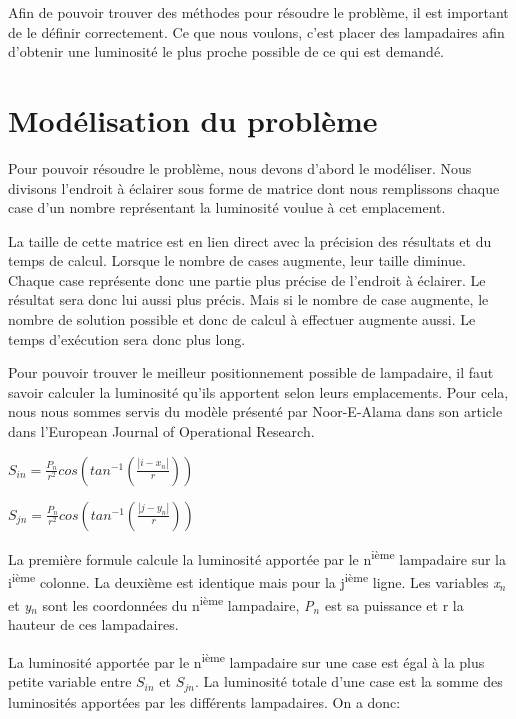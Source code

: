 Afin de pouvoir trouver des m\'{e}thodes pour r\'{e}soudre le probl\`{e}me, il est important de le d\'{e}finir correctement. Ce que nous voulons, c'est placer des lampadaires afin d'obtenir une luminosit\'{e} le plus proche possible de ce qui est demand\'{e}.

\section{Mod\'{e}lisation du probl\`{e}me}
Pour pouvoir r\'{e}soudre le probl\`{e}me, nous devons d'abord le mod\'{e}liser.  Nous divisons l'endroit \`{a} \'{e}clairer sous forme de matrice dont nous remplissons chaque case d'un nombre repr\'{e}sentant la luminosit\'{e} voulue \`{a} cet emplacement.

La taille de cette matrice est en lien direct avec la pr\'{e}cision des r\'{e}sultats et du temps de calcul. Lorsque le nombre de cases augmente, leur taille diminue. Chaque case repr\'{e}sente donc une partie plus pr\'{e}cise de l'endroit \`{a} \'{e}clairer. Le r\'{e}sultat sera donc lui aussi plus pr\'{e}cis. Mais si le nombre de case augmente, le nombre de solution possible et donc de calcul \`{a} effectuer augmente aussi. Le temps d'ex\'{e}cution sera donc plus long.

Pour pouvoir trouver le meilleur positionnement possible de lampadaire, il faut savoir calculer la luminosité qu'ils apportent selon leurs emplacements. Pour cela, nous nous sommes servis du modèle présenté par Noor-E-Alama dans son article dans l'European Journal of Operational Research.

$
S_{in}=\frac{P_{n}}{r^{2}} cos \left (tan^{-1}\left (\frac{\left |i-x_{n}  \right |}{r}  \right )   \right )
$


$
S_{jn}=\frac{P_{n}}{r^{2}} cos \left (tan^{-1}\left (\frac{\left |j-y_{n}  \right |}{r}  \right )   \right )
$

La première formule calcule la luminosité apportée par le n\textsuperscript{ième} lampadaire sur la i\textsuperscript{ième} colonne. La deuxième est identique mais pour la j\textsuperscript{ième} ligne. Les variables \textit{x}$_{n}$ et \textit{y}$_{n}$ sont les coordonnées du n\textsuperscript{ième} lampadaire, \textit{P}$_{n}$ est sa puissance et r la hauteur de ces lampadaires.

La luminosité apportée par le n\textsuperscript{ième} lampadaire sur une case est égal à la plus petite variable entre $S_{in}$ et $S_{jn}$.
La luminosité totale d'une case est la somme des luminosités apportées par les différents lampadaires.
On a donc:

